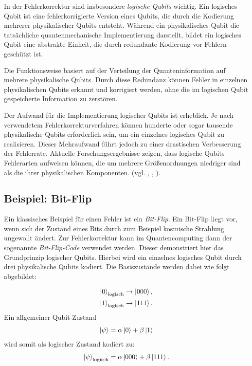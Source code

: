 In der Fehlerkorrektur sind insbesondere \emph{logische Qubits} wichtig. Ein logisches Qubit ist eine fehlerkorrigierte Version eines Qubits, die durch die Kodierung mehrerer physikalischer Qubits entsteht. Während ein physikalisches Qubit die tatsächliche quantenmechanische Implementierung darstellt, bildet ein logisches Qubit eine abstrakte Einheit, die durch redundante Kodierung vor Fehlern geschützt ist.

Die Funktionsweise basiert auf der Verteilung der Quanteninformation auf mehrere physikalische Qubits. Durch diese Redundanz können Fehler in einzelnen physikalischen Qubits erkannt und korrigiert werden, ohne die im logischen Qubit gespeicherte Information zu zerstören. 

Der Aufwand für die Implementierung logischer Qubits ist erheblich. Je nach verwendetem Fehlerkorrekturverfahren können hunderte oder sogar tausende physikalische Qubits erforderlich sein, um ein einzelnes logisches Qubit zu realisieren. Dieser Mehraufwand führt jedoch zu einer drastischen Verbesserung der Fehlerrate. Aktuelle Forschungsergebnisse zeigen, dass logische Qubits Fehlerarten aufweisen können, die um mehrere Größenordnungen niedriger sind als die ihrer physikalischen Komponenten. (vgl. \cite{divincenzo_topics_1996}, \cite[426 ff.]{nielsen_quantum_2010}, \cite{ibm_quantum_error}).


\subsection{Beispiel: Bit-Flip}
Ein klassisches Beispiel für einen Fehler ist ein \emph{Bit-Flip}. Ein Bit-Flip liegt vor, wenn sich der Zustand eines Bits durch zum Beispiel kosmische Strahlung ungewollt ändert. Zur Fehlerkorrektur kann im Quantencomputing dann der sogenannte \emph{Bit-Flip-Code} verwendet werden. Dieser demonstriert hier das Grundprinzip logischer Qubits. Hierbei wird ein einzelnes logisches Qubit durch drei physikalische Qubits kodiert. Die Basiszustände werden dabei wie folgt abgebildet:

\begin{align}
\ket{0}_\text{logisch} &\rightarrow \ket{000}, \\
\ket{1}_\text{logisch} &\rightarrow \ket{111}.
\end{align}
Ein allgemeiner Qubit-Zustand
\begin{equation}
\ket{\psi} = \alpha \ket{0} + \beta \ket{1}
\end{equation}
wird somit als logischer Zustand kodiert zu:
\begin{equation}
\ket{\psi}_\text{logisch} = \alpha \ket{000} + \beta \ket{111}.
\end{equation}

